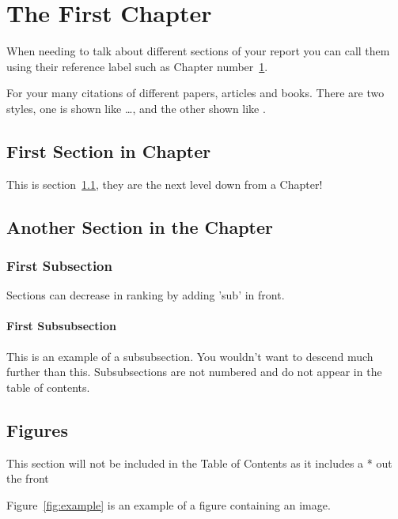 \chapter{The First Chapter}\label{chap:first}

When needing to talk about different sections of your report you can call them using their reference label such as Chapter number~\ref*{chap:first}.

For your many citations of different papers, articles and books. There are two styles, one is shown like \dots \citet{Honsinger71a}, and the other shown like \citep{EPRI01}.

\section{First Section in Chapter}\label{first:sec}

This is section~\ref{first:sec}, they are the next level down from a Chapter!

\section{Another Section in the Chapter}

\subsection{First Subsection}

Sections can decrease in ranking by adding 'sub' in front.

\subsubsection{First Subsubsection}

This is an example of a subsubsection. You wouldn't want to descend much further
than this. Subsubsections are not numbered and do not appear in the table of
contents.

\section*{Figures}

This section will not be included in the Table of Contents as it includes a * out the front

Figure~\ref{fig:example} is an example of a figure containing an image.

